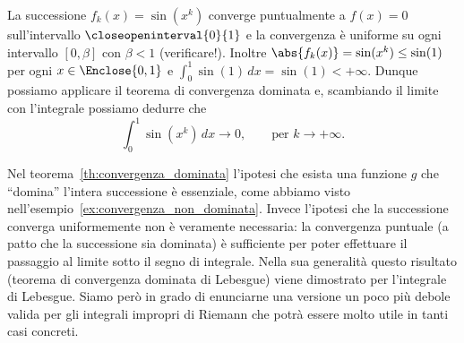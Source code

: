 \begin{example}
La successione $f_k(x) = \sin(x^k)$ converge puntualmente a $f(x)=0$ sull'intervallo
$\closeopeninterval{0}{1}$ e la convergenza è uniforme su ogni intervallo $[0,\beta]$
con $\beta < 1$ (verificare!).
Inoltre $\abs{f_k(x)} = \sin(x^k) \le \sin(1)$ per ogni $x\in \Enclose{0,1}$
e $\int_0^1 \sin(1)\, dx = \sin(1)< +\infty$.
Dunque possiamo applicare il teorema di convergenza dominata e,
scambiando il limite con l'integrale possiamo dedurre che
\[
  \int_0^1 \sin (x^k)\, dx \to 0, \qquad \text{per $k\to +\infty$.}
\]
\end{example}

Nel teorema~\ref{th:convergenza_dominata}
l'ipotesi che esista una funzione $g$ che ``domina'' l'intera successione 
è essenziale, come abbiamo visto nell'esempio~\ref{ex:convergenza_non_dominata}.
Invece l'ipotesi che la successione converga uniformemente non è veramente necessaria:
la convergenza puntuale (a patto che la successione sia dominata) è sufficiente 
per poter effettuare il passaggio al limite sotto il segno di integrale.
Nella sua generalità questo risultato (teorema di convergenza dominata di Lebesgue) 
viene dimostrato per l'integrale di Lebesgue.
%
%
%
%
%
Siamo però in grado di enunciarne una versione un poco più debole valida per gli 
integrali impropri di Riemann che potrà essere molto utile in tanti casi concreti.

